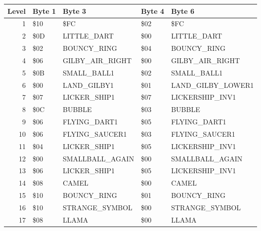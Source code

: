 \begin{figure}[H]
  {
  \setlength{\tabcolsep}{3.0pt}
  \setlength\cmidrulewidth{\heavyrulewidth} %
  \begin{adjustbox}{width=\textwidth}

\begin{tabular}{rllll}
\toprule
   Level & Byte 1    & Byte 3               & Byte 4    & Byte 6                  \\
\midrule
       1 & \$10       & \$FC                  & \$02       & \$FC                     \\
       2 & \$0D       & LITTLE\_DART          & \$00       & LITTLE\_DART             \\
       3 & \$02       & BOUNCY\_RING          & \$04       & BOUNCY\_RING             \\
       4 & \$06       & GILBY\_AIR\_RIGHT & \$00       & GILBY\_AIR\_RIGHT    \\
       5 & \$0B       & SMALL\_BALL1          & \$02       & SMALL\_BALL1             \\
       6 & \$00       & LAND\_GILBY1          & \$01       & LAND\_GILBY\_LOWER1 \\
       7 & \$07       & LICKER\_SHIP1         & \$07       & LICKERSHIP\_INV1         \\
       8 & \$0C       & BUBBLE               & \$03       & BUBBLE                  \\
       9 & \$06       & FLYING\_DART1         & \$05       & FLYING\_DART1            \\
      10 & \$06       & FLYING\_SAUCER1       & \$03       & FLYING\_SAUCER1          \\
      11 & \$04       & LICKER\_SHIP1         & \$05       & LICKERSHIP\_INV1         \\
      12 & \$00       & SMALLBALL\_AGAIN      & \$00       & SMALLBALL\_AGAIN         \\
      13 & \$06       & LICKER\_SHIP1         & \$05       & LICKERSHIP\_INV1         \\
      14 & \$08       & CAMEL                & \$00       & CAMEL                   \\
      15 & \$10       & BOUNCY\_RING          & \$01       & BOUNCY\_RING             \\
      16 & \$10       & STRANGE\_SYMBOL       & \$00       & STRANGE\_SYMBOL          \\
      17 & \$08       & LLAMA                & \$00       & LLAMA                   \\

\end{tabular}
\end{adjustbox}}
\end{figure}
